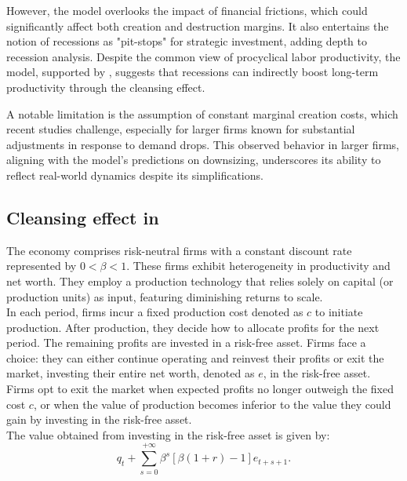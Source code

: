 \documentclass[12pt]{report}
\begin{document}
However, the model overlooks the impact of financial frictions, which could significantly affect both creation and
destruction margins. It also entertains the notion of recessions as "pit-stops" for strategic investment, adding depth
to recession analysis. Despite the common view of procyclical labor productivity, the model, supported by
\cite{GaHam92},  suggests that recessions can indirectly boost long-term productivity through the cleansing effect.

A notable limitation is the assumption of constant marginal creation costs, which recent studies challenge, especially
for larger firms known for substantial adjustments in response to demand drops. This observed behavior in larger firms,
aligning with the model's predictions on downsizing, underscores its ability to reflect real-world dynamics despite  its
simplifications.
\subsection{Cleansing effect in \cite{OsePap17}}
The economy comprises risk-neutral firms with a constant discount rate represented by $0 < \beta < 1$. These firms
exhibit heterogeneity in productivity and net worth. They employ a production technology that relies solely on capital
(or production units) as input, featuring diminishing returns to scale.
\\
In each period, firms incur a fixed production cost denoted as $c$ to initiate production. After production, they decide
how to allocate profits for the next period. The remaining profits are invested in a risk-free asset. Firms face a
choice: they can either continue operating and reinvest their profits or exit the market, investing their entire net
worth, denoted as $e$, in the risk-free asset.
\\
Firms opt to exit the market when expected profits no longer outweigh the fixed cost $c$, or when the value of
production becomes inferior to the value they could gain by investing in the risk-free asset.
\\
The value obtained from investing in the risk-free asset is given by:
\[
q_t + \sum_{s=0}^{+\infty}\beta^s[\beta(1+r)-1]e_{t+s+1}.
\]
\end{document}
